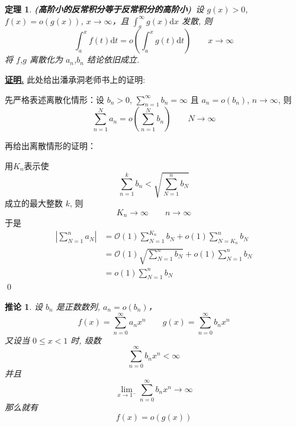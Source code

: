 \documentclass[10pt,a4paper]{book}
\theoremstyle{thmstyle} %
\newtheorem{theorem}{定理}[chapter]
\theoremstyle{defstyle} %
\newtheorem{corollary}{推论}[chapter]
\theoremstyle{prostyle} %
\renewenvironment{proof}[1][证明]{\par{\kaishu \uline{\textbf{#1.}}} \;\fangsong}{\qed\par}
\begin{document}
	\begin{theorem}
		\textbf{(高阶小的反常积分等于反常积分的高阶小)}\ 设 $g(x)>0$, $f(x)=o(g(x))$, $x\rightarrow\infty$，且 $\displaystyle\int_{a}^{\infty }g(x)\mathrm{d}x$ 发散, 则
		$$
		\int_a^x{f\left( t \right) \mathrm{d}t=o\left( \int_a^x{g\left( t \right) \mathrm{d}t} \right)}\quad\quad x\rightarrow\infty
		$$
		将 $f$,$g$ 离散化为 $a_n$,$b_n$ 结论依旧成立.
	\end{theorem}
	\begin{proof}
		此处给出潘承洞老师书上的证明:
		
		先严格表述离散化情形：设 $b_n>0$, $\sum\limits_{n=1}^{\infty}b_n=\infty$ 且 $a_n=o(b_n)$, $n\rightarrow\infty$, 则
		$$
		\sum_{n=1}^N{a_n=o\left( \sum_{n=1}^N{b_n} \right)}\quad\quad N\rightarrow\infty
		$$
		
		再给出离散情形的证明：
		
		用$K_n$表示使
		$$
		\sum_{n=1}^k{b_n<\sqrt{\sum_{N=1}^n{b_N}}}
		$$
		成立的最大整数 $k$, 则
		$$
		K_n\rightarrow\infty\quad\quad n\rightarrow\infty
		$$
		于是
		\begin{align*}
			|\sum_{N=1}^n{a_N}|&=\mathcal{O} \left( 1 \right) \sum_{N=1}^{K_n}{b_N}+o\left( 1 \right) \sum_{N=K_n}^n{b_N}
			\\
			&=\mathcal{O} \left( 1 \right) \sqrt{\sum_{N=1}^n{b_N}}+o\left( 1 \right) \sum_{N=1}^n{b_N}
			\\
			&=o\left( 1 \right) \sum_{N=1}^n{b_N}
		\end{align*}
	\end{proof}
	\begin{corollary}
		设 ${b_n}$ 是正数数列, $a_n=o(b_n)$，
		$$
		f\left( x \right) =\sum_{n=0}^{\infty}{a_nx^n\quad \quad g\left( x \right) =}\sum_{n=0}^{\infty}{b_nx^n}
		$$
		又设当 $0\leqslant x<1$ 时, 级数
		$$
		\sum_{n=0}^{\infty}{b_nx^n}<\infty 
		$$
		并且
		$$
		\lim\limits_{x\rightarrow 1^-}\sum_{n=0}^{\infty}{b_nx^n}\rightarrow\infty 
		$$
		那么就有
		$$
		f(x)=o(g(x))
		$$
	\end{corollary}
\end{document}
